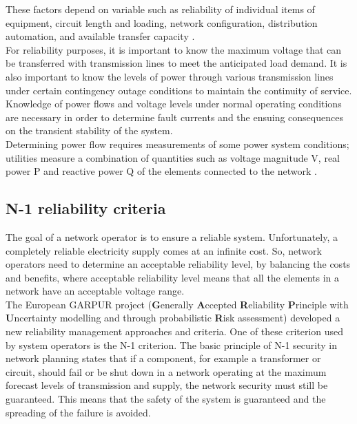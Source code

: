 These factors depend on variable such as reliability of individual items of equipment, circuit length and loading, network configuration, distribution automation, and available transfer capacity \cite{EDNdesign}. \\

For reliability purposes, it is important to know the maximum voltage that can be
transferred with transmission lines to meet the anticipated load demand. It is also important to know the levels of power through various transmission lines under certain contingency outage conditions to maintain the continuity of service. Knowledge of power flows and voltage levels under normal operating conditions are necessary in order to determine fault currents and the ensuing consequences on the transient stability of the system. \\

Determining power flow requires measurements of some power system conditions; utilities measure a combination of quantities such as voltage magnitude \gls{V}, real power \gls{P} and reactive power \gls{Q} of the elements connected to the network \cite{eps}. 

\subsection{N-1 reliability criteria}
The goal of a network operator is to ensure a reliable system. Unfortunately, a completely reliable electricity supply comes at an infinite cost. So, network operators need to determine an acceptable reliability level, by balancing the costs and benefits, where acceptable reliability level means that all the elements in a network have an acceptable voltage range. \\

The European \gls{GARPUR} project (\textbf{G}enerally \textbf{A}ccepted \textbf{R}eliability \textbf{P}rinciple with \textbf{U}ncertainty modelling and through probabilistic \textbf{R}isk assessment) developed a new reliability
management approaches and criteria. One of these criterion used by system operators is the N-1 criterion. The basic principle of N-1 security in network planning states that if a component, for example a transformer or circuit, should fail or be shut down in a network operating at the maximum forecast levels of transmission and supply, the network security must still be guaranteed. This means that the safety of the system is guaranteed and the spreading of the failure is avoided. \\

